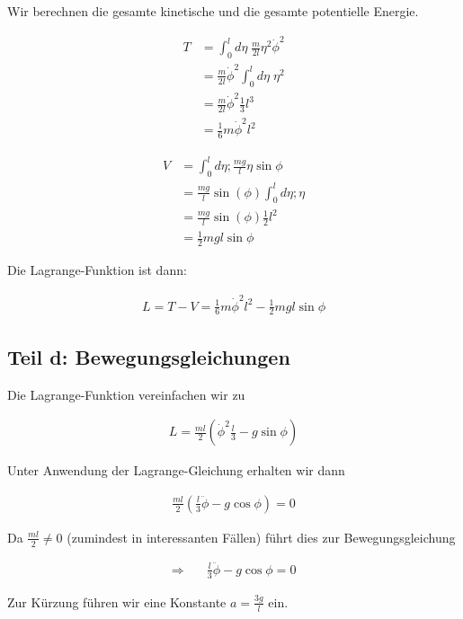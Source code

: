 \documentclass[a4paper,german,12pt,smallheadings]{scrartcl}
\begin{document}
Wir berechnen die gesamte kinetische und die gesamte potentielle Energie.

\begin{align*}
  T &= \int_0^l d \eta\; \frac{m}{2l} \eta^2 \dot{\phi}^2 \\
    &= \frac{m}{2l} \dot{\phi}^2 \int_0^l d\eta \; \eta^2 \\
    &= \frac{m}{2l} \dot{\phi}^2 \frac{1}{3} l^3 \\
    &= \frac{1}{6} m \dot{\phi}^2 l^2
\end{align*}

\begin{align*}
  V &= \int_0^l d \eta; \frac{mg}{l} \eta \sin \phi \\
    &= \frac{mg}{l} \sin(\phi) \int_0^l d \eta; \eta \\
    &= \frac{mg}{l} \sin(\phi) \frac{1}{2} l^2 \\
    &= \frac{1}{2} mgl \sin \phi
\end{align*}

Die Lagrange-Funktion ist dann:

\begin{align*}
  L = T - V = \frac{1}{6} m \dot{\phi}^2 l^2 - \frac{1}{2} mgl \sin \phi
\end{align*}

\subsection*{Teil d: Bewegungsgleichungen}

Die Lagrange-Funktion vereinfachen wir zu

\begin{align*}
  L = \frac{ml}{2}\left(\dot{\phi}^2 \frac{l}{3} - g \sin \phi\right)
\end{align*}

Unter Anwendung der Lagrange-Gleichung erhalten wir dann

\begin{align*}
  \frac{ml}{2} \left(\frac{l}{3} \ddot{\phi} - g \cos \phi\right) = 0
\end{align*}

Da $\frac{ml}{2} \neq 0$ (zumindest in interessanten Fällen) führt dies zur Bewegungsgleichung

\begin{align*}
  \Rightarrow\quad&\frac{l}{3} \ddot{\phi} - g \cos \phi = 0
\end{align*}

Zur Kürzung führen wir eine Konstante $a = \frac{3g}{l}$ ein.
\end{document}
